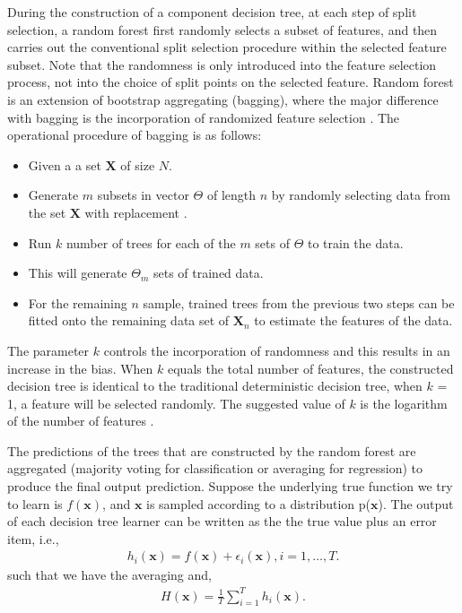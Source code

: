 During the construction of a component decision tree, at each step
of split selection, a random forest first randomly selects a subset of features, and then carries out the conventional split selection procedure within the selected
feature subset. Note that the randomness is only introduced into
the feature selection process, not into the choice of split points on the selected feature. Random forest is an extension of bootstrap aggregating (bagging), where the major difference with bagging is the incorporation of randomized feature selection \citep{zhou2012ensemble}. The operational procedure of bagging is as follows: 

\begin{itemize}
\item Given a a set $\textbf{X}$ of size $\textit{N}$.
\item Generate $\textit{m}$ subsets in vector $\Theta$  of length $\textit{n}$ by randomly selecting data from the set $\textbf{X}$ with replacement \citep{breiman2001random}. 
\item Run $\textit{k}$ number of trees for each of the $\textit{m}$ sets of $\Theta$ to train the data.
\item This will generate $\Theta_{\textit{m}}$ sets of trained data.
\item For the remaining $\textit{n}$ sample, trained trees from the previous two steps can be fitted onto the remaining
data set of $\textbf{X}_{\textit{n}}$ to estimate the features of the data.
\end{itemize}

The parameter $\textit{k}$ controls the incorporation of randomness and this results in an increase in the bias. When $\textit{k}$ equals the total number of features, the constructed decision tree is identical to the traditional deterministic decision tree, when $\textit{k}$ = 1, a feature will be selected randomly. The suggested value of $\textit{k}$ is the logarithm of the number of features \citep{breiman2001random}.

The predictions of the trees that are constructed by the random forest are aggregated (majority voting for classification or averaging for regression) to produce the final output prediction. Suppose the underlying true function we try to learn is $f(\textbf{x})$, and $\textbf{x}$ is sampled according to a distribution p($\textbf{x}$). The output of each decision tree learner can be written as the the true value plus an error item, i.e.,
\begin{align}
h_{i}(\textbf{x})= f(\textbf{x}) + \epsilon_{i} (\textbf{x}), i = 1, \dots,T.
\label{hx}
\end{align}
such that we have the averaging and, 
\begin{align}
H(\textbf{x})= \frac{1}{T}\sum_{i=1}^{T} h_{i}(\textbf{x}). 
\label{averageRF}
\end{align}
\citep{zhou2012ensemble}

